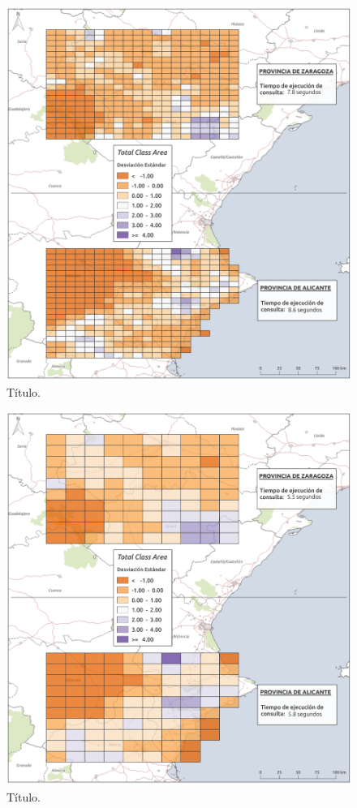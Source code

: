 \begin{figure}
\begin{center}
\includegraphics[width=\textwidth]{ResultadosyDiscusion/Figs/Results/c_25.png}
\caption{Título.}
\end{center}
\end{figure}

\begin{figure}
\begin{center}
\includegraphics[width=\textwidth]{ResultadosyDiscusion/Figs/Results/c_50.png}
\caption{Título.}
\end{center}
\end{figure}

